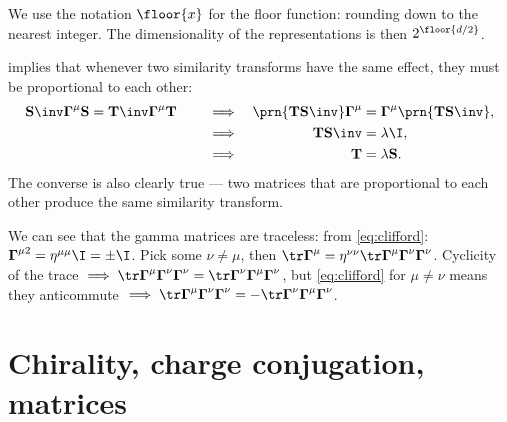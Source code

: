 \documentclass[11pt]{article}
\newcommand{\Gammab}{\boldsymbol{\Gamma}}
\renewcommand{\S}{\mathbf{S}}
\newcommand{\T}{\mathbf{T}}
\begin{document}
We use the notation $\floor{x}$ for the floor function: rounding down to the nearest integer.
The dimensionality of the representations is then $2^{\floor{d/2}}$.

 implies that whenever two similarity transforms have the same effect, they must be proportional to each other:
%
\begin{equation}\label{eq:simsim}
  \S\inv \Gammab^\mu \S = \T\inv \Gammab^\mu \T
  \qquad
  \begin{aligned}[t]
     &\implies &
     \prn{\T \S\inv} \Gammab^\mu &= \Gammab^\mu \prn{\T \S\inv}, \\
     &\implies &
     \T \S\inv &= \lambda \I, \\
     &\implies &
     \T &= \lambda \S.
  \end{aligned}
\end{equation}
%
The converse is also clearly true --- two matrices that are proportional to each other produce the same similarity transform.

We can see that the gamma matrices are traceless: from \cref{eq:clifford}: \( \Gammab^{\mu2} = \eta^{\mu\mu} \I = \pm \I \).
Pick some $\nu \neq \mu$, then \( \tr \Gammab^\mu = \eta^{\nu\nu} \tr \Gammab^\mu \Gammab^\nu \Gammab^\nu \).
Cyclicity of the trace \( \implies \tr \Gammab^\mu \Gammab^\nu \Gammab^\nu = \tr \Gammab^\nu \Gammab^\mu \Gammab^\nu \), but \cref{eq:clifford} for $\mu \neq \nu$ means they anticommute \( \implies \tr \Gammab^\mu \Gammab^\nu \Gammab^\nu = - \tr \Gammab^\nu \Gammab^\mu \Gammab^\nu \).


\section{Chirality, charge conjugation, \etc matrices}\label{sec:ccmats}
\end{document}
